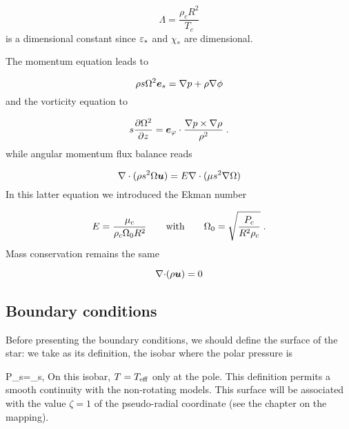 \begin{equation} \Lambda = \frac{\rho_c R^2}{T_c}\end{equation}
is a dimensional constant since $\varepsilon_*$ and $\chi_*$ are dimensional. 

The momentum equation leads to

\begin{equation}
\rho s\Omega^2\es=\na p+\rho\na\phi
\label{barocnd}
\end{equation}
and the vorticity equation to

\begin{equation}
s\frac{\partial\Omega^2}{\partial z}=\ephi\cdot\frac{\na
p\times\na\rho}{\rho^2} \;.
\end{equation}
while angular momentum flux balance reads

\begin{equation}
\label{eq:angular_momnd}
\na\cdot{(\rho s^2\Omega\vu)}=E\na\cdot (\mu s^2\na\Omega)
\end{equation}
In this latter equation we introduced the Ekman number

\begin{equation} E = \frac{\mu_c}{\rho_c \Omega_0 R^2} {\qquad {\rm with}\qquad}
\Omega_0=\sqrt{\frac{P_c}{R^2\rho_c}}\; .\end{equation}
Mass conservation remains the same

\begin{equation} \Div(\rho\vu) =0\end{equation}

\subsection{Boundary conditions}

Before presenting the boundary conditions, we should define the surface
of the star: we take as its definition, the isobar where the polar
pressure is 

\beq P_s=\tau_s,\eeq
On this isobar, $T=T_{\rm eff}$ only at the pole. This definition
permits a smooth continuity with the non-rotating models. This surface
will be associated with the value $\zeta=1$ of the pseudo-radial
coordinate (see the chapter on the mapping).

